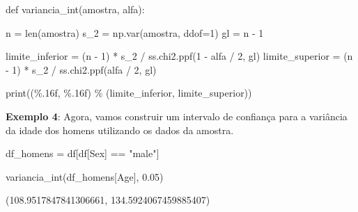 \documentclass[
  letterpaper,
  DIV=11,
  numbers=noendperiod]{scrreprt}
\newenvironment{Shaded}{\begin{snugshade}}{\end{snugshade}}
\newcommand{\BuiltInTok}[1]{\textcolor[rgb]{0.00,0.23,0.31}{#1}}
\newcommand{\DecValTok}[1]{\textcolor[rgb]{0.68,0.00,0.00}{#1}}
\newcommand{\FloatTok}[1]{\textcolor[rgb]{0.68,0.00,0.00}{#1}}
\newcommand{\KeywordTok}[1]{\textcolor[rgb]{0.00,0.23,0.31}{#1}}
\newcommand{\NormalTok}[1]{\textcolor[rgb]{0.00,0.23,0.31}{#1}}
\newcommand{\OperatorTok}[1]{\textcolor[rgb]{0.37,0.37,0.37}{#1}}
\newcommand{\SpecialCharTok}[1]{\textcolor[rgb]{0.37,0.37,0.37}{#1}}
\newcommand{\StringTok}[1]{\textcolor[rgb]{0.13,0.47,0.30}{#1}}
\begin{document}
\begin{Shaded}
\begin{Highlighting}[]
\KeywordTok{def}\NormalTok{ variancia\_int(amostra, alfa):}
    
\NormalTok{    n }\OperatorTok{=} \BuiltInTok{len}\NormalTok{(amostra)                }
\NormalTok{    s\_2 }\OperatorTok{=}\NormalTok{ np.var(amostra, ddof}\OperatorTok{=}\DecValTok{1}\NormalTok{)   }
\NormalTok{    gl }\OperatorTok{=}\NormalTok{ n }\OperatorTok{{-}} \DecValTok{1}  
    
\NormalTok{    limite\_inferior }\OperatorTok{=}\NormalTok{ (n }\OperatorTok{{-}} \DecValTok{1}\NormalTok{) }\OperatorTok{*}\NormalTok{ s\_2 }\OperatorTok{/}\NormalTok{ ss.chi2.ppf(}\DecValTok{1} \OperatorTok{{-}}\NormalTok{ alfa }\OperatorTok{/} \DecValTok{2}\NormalTok{, gl)}
\NormalTok{    limite\_superior }\OperatorTok{=}\NormalTok{ (n }\OperatorTok{{-}} \DecValTok{1}\NormalTok{) }\OperatorTok{*}\NormalTok{ s\_2 }\OperatorTok{/}\NormalTok{ ss.chi2.ppf(alfa }\OperatorTok{/} \DecValTok{2}\NormalTok{, gl)}
    
    \BuiltInTok{print}\NormalTok{(}\StringTok{\textquotesingle{}(}\SpecialCharTok{\%.16f}\StringTok{, }\SpecialCharTok{\%.16f}\StringTok{)\textquotesingle{}} \OperatorTok{\%}\NormalTok{ (limite\_inferior, limite\_superior))}
\end{Highlighting}
\end{Shaded}

\textbf{Exemplo 4}: Agora, vamos construir um intervalo de confiança
para a variância da idade dos homens utilizando os dados da amostra.

\begin{Shaded}
\begin{Highlighting}[]
\NormalTok{df\_homens }\OperatorTok{=}\NormalTok{ df[df[}\StringTok{\textquotesingle{}Sex\textquotesingle{}}\NormalTok{] }\OperatorTok{==} \StringTok{"male"}\NormalTok{]}
\end{Highlighting}
\end{Shaded}

\begin{Shaded}
\begin{Highlighting}[]
\NormalTok{variancia\_int(df\_homens[}\StringTok{\textquotesingle{}Age\textquotesingle{}}\NormalTok{], }\FloatTok{0.05}\NormalTok{)}
\end{Highlighting}
\end{Shaded}

\begin{tcolorbox}[enhanced jigsaw, breakable, leftrule=.75mm, left=2mm, opacityback=0, bottomrule=.15mm, toprule=.15mm, rightrule=.15mm, arc=.35mm, colback=white]

(108.9517847841306661, 134.5924067459885407)

\end{tcolorbox}
\end{document}
